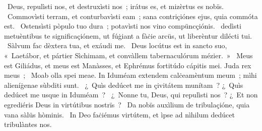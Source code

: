 \psalmChapterWithInscription{}
{ }
{%
~Deus, repulìsti nos, et destruxìsti nos~; irátus es, et mizèrtus es nobïs. 
~Commovìsti terram, et conturbavìsti eam~; sana contriçiónes ejus, quia commóta est. 
~Ostensìsti pòpulo tuo dura~; potavìsti nos vino compüncçiónis. 
~dedìsti metuèntibus te significaçiónem, ut fúġiant a fàċie arcüs, ut liberèntur dilécti tui. 
~Sàlvum fac dèxtera tua, et exáudi me. 
~Deus locútus est in sancto suo, «~Laetábor, et pártier Sìchimam, et convàllem tabernaculórum mézier.~»
~Meus est Giliádus, et meus est Manàsses, et Ephrémus fortitúdo cápitis mei. Juda rex meus~; 
~Moab olla spei meae. In Iduméam extendem calċeamèntum meum~; mìhi alieníġenae sùbditi sunt. 
~¿~Quìs dedúcet me in çivitátem munítam~? ¿~Quìs dedúcet me usque in Iduméam~? 
~¿~Nonne tu, Deus, qui repulìsti nos~? ¿~Et non egrediéris Deus in virtútibus nostrïs~? 
~Da nobïs auxìlium de tribulaçióne, quia vana sàlüs hòminis. 
~In Deo faċiémus virtútem, et ìpse ad nìhilum dedúcet tribulàntes nos. 
}
